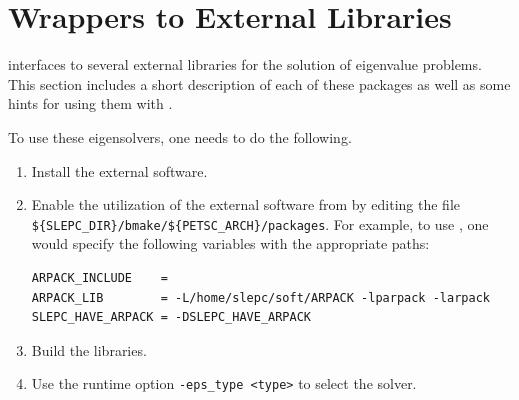 %

\section{Wrappers to External Libraries}
\label{sec:wrap}

	\slepc interfaces to several external libraries for the solution of eigenvalue problems. This section includes a short description of each of these packages as well as some hints for using them with \slepc.

	To use these eigensolvers, one needs to do the following.
	\begin{enumerate}
	\item Install the external software.
	\item Enable the utilization of the external software from \slepc by editing the file \Verb!${SLEPC_DIR}/bmake/${PETSC_ARCH}/packages!. For example, to use \arpack, one would specify the following variables with the appropriate paths:
	\begin{Verbatim}[fontsize=\small]
ARPACK_INCLUDE    = 
ARPACK_LIB        = -L/home/slepc/soft/ARPACK -lparpack -larpack
SLEPC_HAVE_ARPACK = -DSLEPC_HAVE_ARPACK
	\end{Verbatim}
	\item Build the \slepc libraries.
	\item Use the runtime option \Verb!-eps_type <type>! to select the solver.
	\end{enumerate}

